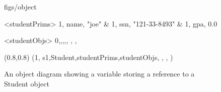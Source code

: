





\begin {figure}


\Draw

 {figs/object}

\Indirect \Table <studentPrims>
{  
   1, name, "joe" 		&
   1, ssn,  "121-33-8493"		&
   1, gpa,  0.0			
}


\Indirect \Table <studentObjs>
 {  0,,,,, , , }
  


\Scale (0.8,0.8)
\Obj (1, s1,Student,studentPrims,studentObjs, , , )

\EndDraw

\caption {An object diagram showing a variable storing a reference
to a Student object}

\label {fig:assignRef1}

\end {figure}


